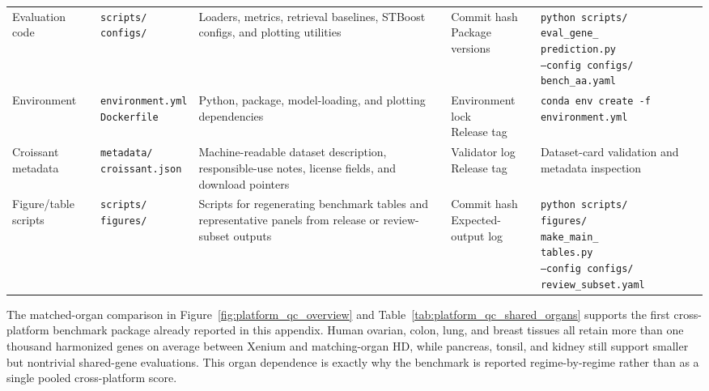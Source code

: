 \documentclass{article}
\begin{document}
\begin{table}[!t]
\begin{tabularx}{\textwidth}{
>{\raggedright\arraybackslash}p{1.75cm}
>{\raggedright\arraybackslash}p{2.15cm}
>{\raggedright\arraybackslash}X
>{\raggedright\arraybackslash}p{1.90cm}
>{\raggedright\arraybackslash}X
}
Evaluation code &
\makecell[l]{\texttt{scripts/}\\
\texttt{configs/}} &
Loaders, metrics, retrieval baselines, STBoost configs, and plotting utilities &
\makecell[l]{Commit hash\\
Package versions} &
\makecell[l]{\texttt{python scripts/}\\
\texttt{eval\_gene\_}\\
\texttt{prediction.py}\\
\texttt{--config configs/}\\
\texttt{bench\_aa.yaml}} \\

Environment &
\makecell[l]{\texttt{environment.yml}\\
\texttt{Dockerfile}} &
Python, package, model-loading, and plotting dependencies &
\makecell[l]{Environment lock\\
Release tag} &
\texttt{conda env create -f environment.yml} \\

Croissant metadata &
\makecell[l]{\texttt{metadata/}\\
\texttt{croissant.json}} &
Machine-readable dataset description, responsible-use notes, license fields, and download pointers &
\makecell[l]{Validator log\\
Release tag} &
Dataset-card validation and metadata inspection \\

Figure/table scripts &
\makecell[l]{\texttt{scripts/}\\
\texttt{figures/}} &
Scripts for regenerating benchmark tables and representative panels from release or review-subset outputs &
\makecell[l]{Commit hash\\
Expected-output log} &
\makecell[l]{\texttt{python scripts/}\\
\texttt{figures/}\\
\texttt{make\_main\_}\\
\texttt{tables.py}\\
\texttt{--config configs/}\\
\texttt{review\_subset.yaml}} \\

\bottomrule
\end{tabularx}
\end{table}

The matched-organ comparison in Figure~\ref{fig:platform_qc_overview} and Table~\ref{tab:platform_qc_shared_organs} supports the first cross-platform benchmark package already reported in this appendix. Human ovarian, colon, lung, and breast tissues all retain more than one thousand harmonized genes on average between Xenium and matching-organ HD, while pancreas, tonsil, and kidney still support smaller but nontrivial shared-gene evaluations. This organ dependence is exactly why the benchmark is reported regime-by-regime rather than as a single pooled cross-platform score.
\end{document}
